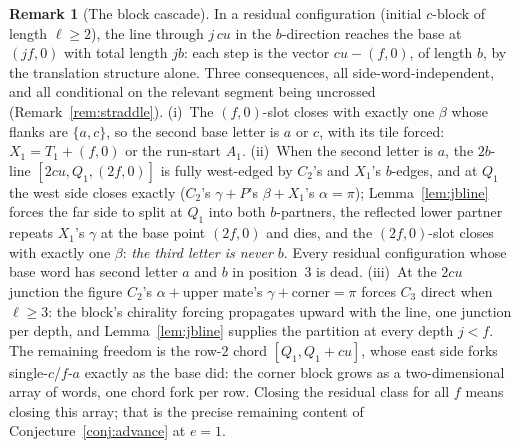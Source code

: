 \documentclass[11pt,reqno]{amsart}
\theoremstyle{plain}
\theoremstyle{definition}
\newtheorem{remark}[theorem]{Remark}
\begin{document}
\begin{remark}[The block cascade]\label{rem:blockcascade}
In a residual configuration (initial $c$-block of length $\ell\ge2$), the line through $j\,cu$ in
the $b$-direction reaches the base at $(jf,0)$ with total length $jb$: each step is the vector
$cu-(f,0)$, of length $b$, by the translation structure alone. Three consequences, all side-word-independent, and all conditional on the relevant
segment being uncrossed (Remark~\ref{rem:straddle}). (i)~The $(f,0)$-slot closes with exactly one $\beta$ whose flanks are
$\{a,c\}$, so the second base letter is $a$ or $c$, with its tile forced: $X_1=T_1+(f,0)$ or the
run-start $A_1$. (ii)~When the second letter is $a$, the $2b$-line $[2cu,Q_1,(2f,0)]$ is fully
west-edged by $C_2$'s and $X_1$'s $b$-edges, and at $Q_1$ the west side closes exactly
($C_2$'s $\gamma+P$'s $\beta+X_1$'s $\alpha=\pi$); Lemma~\ref{lem:jbline} forces the far side to
split at $Q_1$ into both $b$-partners, the reflected lower partner repeats $X_1$'s $\gamma$ at the
base point $(2f,0)$ and dies, and the $(2f,0)$-slot closes with exactly one $\beta$: \emph{the
third letter is never $b$}. Every residual configuration whose base word has second letter $a$ and
$b$ in position~$3$ is dead. (iii)~At the $2cu$ junction the figure $C_2$'s $\alpha+{}$upper mate's
$\gamma+{}$corner${}=\pi$ forces $C_3$ direct when $\ell\ge3$: the block's chirality forcing
propagates upward with the line, one junction per depth, and Lemma~\ref{lem:jbline} supplies the
partition at every depth $j<f$. The remaining freedom is the row-$2$ chord $[Q_1,Q_1+cu]$, whose
east side forks single-$c$/$f$-$a$ exactly as the base did: the corner block grows as a
two-dimensional array of words, one chord fork per row. Closing the residual class for all $f$
means closing this array; that is the precise remaining content of Conjecture~\ref{conj:advance}
at $e=1$.
\end{remark}
\end{document}
